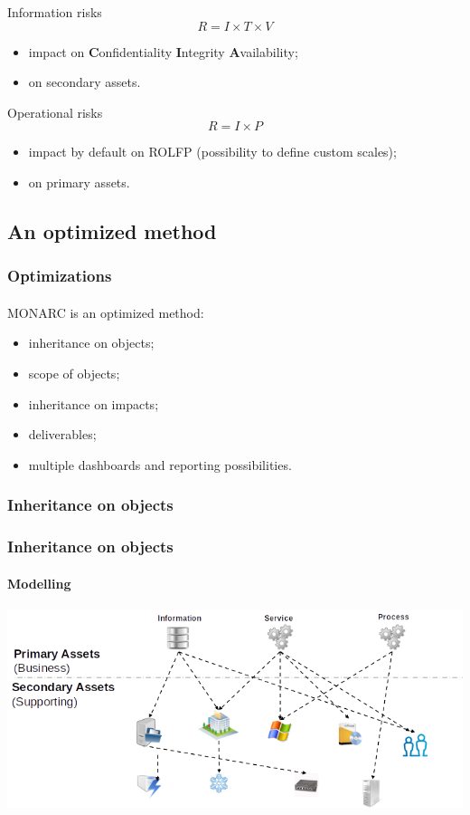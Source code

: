 \begin{frame}
  \begin{block}{Information risks}
    $$R = I \times T \times V$$
    \begin{itemize}
      \item impact on \textbf{C}onfidentiality \textbf{I}ntegrity \textbf{A}vailability;
      \item on secondary assets.
    \end{itemize}
  \end{block}

  \begin{block}{Operational risks}
    $$R = I \times P$$
    \begin{itemize}
      \item impact by default on ROLFP (possibility to define custom scales);
      \item on primary assets.
    \end{itemize}
  \end{block}
\end{frame}



\subsection{An optimized method}
\begin{frame}
  \frametitle{Optimizations}
  \framesubtitle{}
  MONARC is an optimized method:
  \begin{itemize}
    \item inheritance on objects;
    \item scope of objects;
    \item inheritance on impacts;
    \item deliverables;
    \item multiple dashboards and reporting possibilities.
  \end{itemize}
\end{frame}

\subsubsection{Inheritance on objects}
\begin{frame}
  \frametitle{Inheritance on objects}
  \framesubtitle{Modelling}
  \begin{center}
    \includegraphics[scale=0.45]{../common_pictures/MONARC-method-modelling.png}
  \end{center}
\end{frame}

